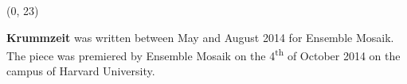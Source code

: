\documentclass[10pt]{article}
\begin{document}
\begin{textblock}{23}(0, 23)

\textbf{Krummzeit} was written between May and August 2014 for Ensemble Mosaik.
The piece was premiered by Ensemble Mosaik on the 4\textsuperscript{th} of
October 2014 on the campus of Harvard University.

\end{textblock}
\end{document}
